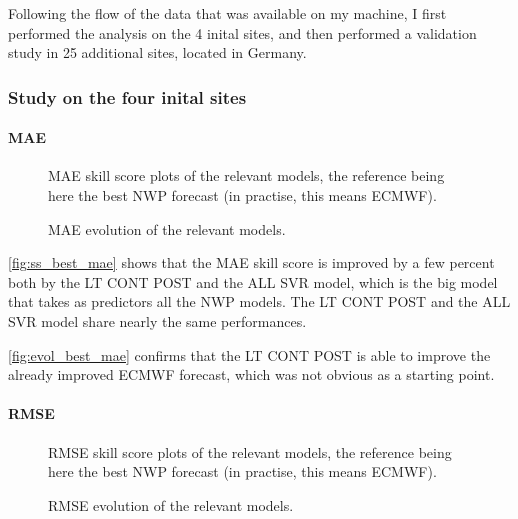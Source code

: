 Following the flow of the data that was available on my machine, I first performed the analysis on the 4 inital sites, and then performed a validation study in 25 additional sites, located in Germany.

\newpage
\subsubsection{Study on the four inital sites}
\label{sec:initial_study}
\paragraph{MAE}
\indent
\begin{figure}[htb!]
    \centering
    
\caption{MAE skill score plots of the relevant models, the reference being here the best NWP forecast (in practise, this means ECMWF).}
\label{fig:ss_best_mae}
\end{figure}

\begin{figure}[htb!]
    \centering
    
\caption{MAE evolution of the relevant models.}
\label{fig:evol_best_mae}
\end{figure}
\newpage
\autoref{fig:ss_best_mae} shows that the MAE skill score is improved by a few percent both by the LT CONT POST and the ALL SVR model, which is the big model that takes as predictors all the NWP models. The LT CONT POST and the ALL SVR model share nearly the same performances.

\autoref{fig:evol_best_mae} confirms that the LT CONT POST is able to improve the already improved ECMWF forecast, which was not obvious as a starting point.

\paragraph{RMSE}
\indent
\begin{figure}[htb!]
    \centering
    
\caption{RMSE skill score plots of the relevant models, the reference being here the best NWP forecast (in practise, this means ECMWF).}
\label{fig:ss_best_rmse}
\end{figure}
\newpage
\begin{figure}[htb!]
    \centering
    
\caption{RMSE evolution of the relevant models.}
\label{fig:evol_best_rmse}
\end{figure}

